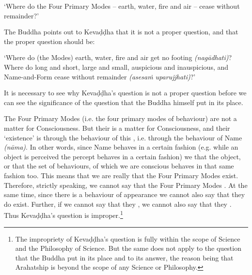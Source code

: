 `Where do the Four Primary Modes -- earth, water, fire and air -- cease without remainder?'

The Buddha points out to Kevaḍḍha that it is not a proper question, and that the proper question should be:

`Where do (the Modes) earth, water, fire and air get no footing \emph{(nagādhati)}? Where do long and short, large and small, auspicious and inauspicious, and Name-and-Form cease without remainder \emph{(asesaṁ uparujjhati)}?'

It is necessary to see why Kevaḍḍha's question is not a proper question before we can see the significance of the question that the Buddha himself put in its place.

\protect\hypertarget{the-four-primary}{}{}The Four Primary Modes (i.e. the four primary modes of behaviour)  are not a matter for Consciousness. But their  is a matter for Consciousness, and their `existence' is  through the behaviour of this , i.e. through the behaviour of Name \emph{(nāma)}. In other words, since Name behaves in a certain fashion (e.g. while an object is perceived the percept behaves in a certain fashion) we  that the object, or that the set of behaviours, of which we are conscious behaves in that same fashion too. This means that we are really  that the Four Primary Modes exist. Therefore, strictly speaking, we cannot say that the Four Primary Modes . At the same time, since there is a behaviour of appearance we cannot also say that they do  exist. Further, if we cannot say that they , we cannot also say that they . Thus Kevaḍḍha's question is improper.\footnote{The impropriety of Kevaḍḍha's question is fully within the scope of Science and the Philosophy of Science. But the same does not apply to the question that the Buddha put in its place and to its answer, the reason being that Arahatship is beyond the scope of any Science or Philosophy.}

